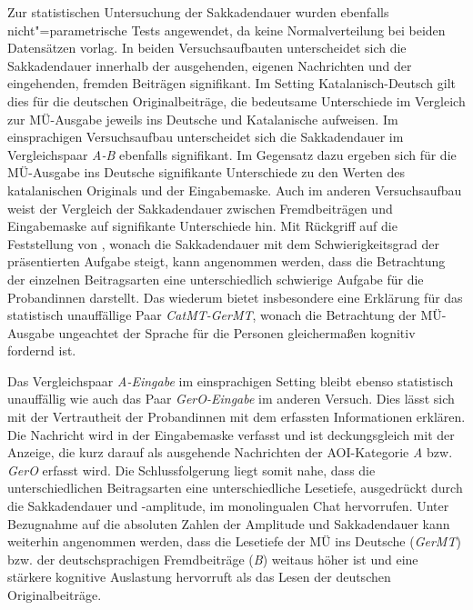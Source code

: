 
Zur statistischen Untersuchung der Sakkadendauer wurden ebenfalls nicht"=parametrische Tests angewendet, da keine Normalverteilung bei beiden Datensätzen vorlag. In beiden Versuchsaufbauten unterscheidet sich die Sakkadendauer innerhalb der ausgehenden, eigenen Nachrichten und der eingehenden, fremden Beiträgen signifikant. Im Setting Katalanisch-Deutsch gilt dies für die deutschen Originalbeiträge, die bedeutsame Unterschiede im Vergleich zur MÜ-Ausgabe jeweils ins Deutsche und Katalanische aufweisen. Im einsprachigen Versuchsaufbau unterscheidet sich die Sakkadendauer im Vergleichspaar \emph{A-B} ebenfalls signifikant. Im Gegensatz dazu ergeben sich für die MÜ-Ausgabe ins Deutsche signifikante Unterschiede zu den Werten des katalanischen Originals und der Eingabemaske. Auch im anderen Versuchsaufbau weist der Vergleich der Sakkadendauer zwischen Fremdbeiträgen und Eingabemaske auf signifikante Unterschiede hin. Mit Rückgriff auf die Feststellung von \citet[322]{holmqvist_eye_2011}, wonach die Sakkadendauer mit dem Schwierigkeitsgrad der präsentierten Aufgabe steigt, kann angenommen werden, dass die Betrachtung der einzelnen Beitragsarten eine unterschiedlich schwierige Aufgabe für die Proband{\textperiodcentered}innen darstellt. Das wiederum bietet insbesondere eine Erklärung für das statistisch unauffällige Paar \emph{CatMT-GerMT}, wonach die Betrachtung der MÜ-Ausgabe ungeachtet der Sprache für die Personen gleichermaßen kognitiv fordernd ist.

Das Vergleichspaar \emph{A-Eingabe} im einsprachigen Setting bleibt ebenso statistisch unauffällig wie auch das Paar \emph{GerO-Eingabe} im anderen Versuch. Dies lässt sich mit der Vertrautheit der Proband{\textperiodcentered}innen mit dem erfassten Informationen erklären. Die Nachricht wird in der Eingabemaske verfasst und ist deckungsgleich mit der Anzeige, die kurz darauf als ausgehende Nachrichten der AOI-Kategorie \emph{A} bzw. \emph{GerO} erfasst wird. Die Schlussfolgerung liegt somit nahe, dass die unterschiedlichen Beitragsarten eine unterschiedliche Lesetiefe, ausgedrückt durch die Sakkadendauer und -amplitude, im monolingualen Chat hervorrufen. Unter Bezugnahme auf die absoluten Zahlen der Amplitude und Sakkadendauer kann weiterhin angenommen werden, dass die Lesetiefe der MÜ ins Deutsche (\emph{GerMT}) bzw. der deutschsprachigen Fremdbeiträge (\emph{B}) weitaus höher ist und eine stärkere kognitive Auslastung hervorruft als das Lesen der deutschen Originalbeiträge.

